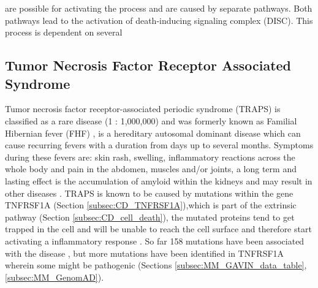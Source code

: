 %
%
%
%
%


 are possible for activating the process and are caused by separate pathways. 
Both pathways lead to the activation of death-inducing signaling complex (DISC). This process is dependent on several 
\label{subsec:CD_cell_death}

\subsection{Tumor Necrosis Factor Receptor Associated Syndrome}
Tumor necrosis factor receptor-associated periodic syndrome (TRAPS) is classified as a rare disease (1 : 1,000,000) and was formerly known as Familial Hibernian fever (FHF) \cite{}, is a hereditary autosomal dominant disease which can cause recurring fevers with a duration from days up to several months. Symptoms during these fevers are: skin rash, swelling, inflammatory reactions across the whole body and pain in the abdomen, muscles and/or joints, a long term and lasting effect is the accumulation of amyloid within the kidneys and may result in other diseases \cite{}. 
TRAPS is known to be caused by mutations within the gene TNFRSF1A (Section \ref{subsec:CD_TNFRSF1A}),which is part of the extrinsic pathway (Section \ref{subsec:CD_cell_death}), the mutated proteins tend to get trapped in the cell and will be unable to reach the cell surface and therefore start activating a inflammatory response \cite{}.
So far 158 mutations have been associated with the disease \cite{}, but more mutations have been identified in TNFRSF1A wherein some might be pathogenic (Sections \ref{subsec:MM_GAVIN_data_table}, \ref{subsec:MM_GenomAD}).
\label{subsec:CD_TRAPS}

